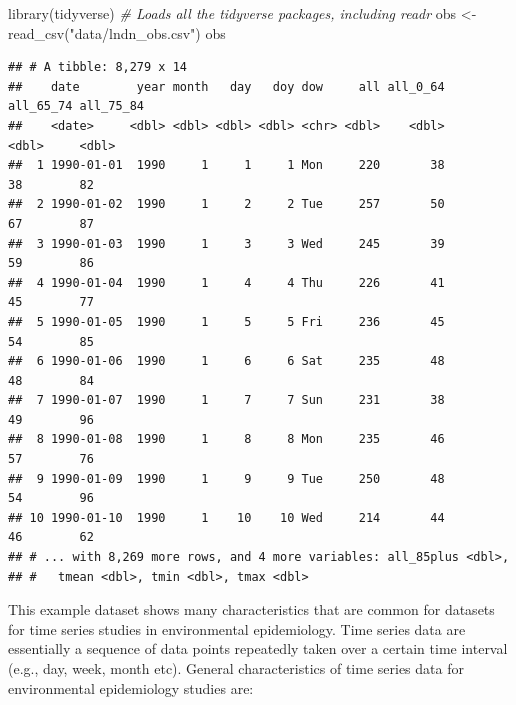 \documentclass[
]{book}
\newenvironment{Shaded}{\begin{snugshade}}{\end{snugshade}}
\newcommand{\CommentTok}[1]{\textcolor[rgb]{0.56,0.35,0.01}{\textit{#1}}}
\newcommand{\FunctionTok}[1]{\textcolor[rgb]{0.00,0.00,0.00}{#1}}
\newcommand{\NormalTok}[1]{#1}
\newcommand{\OtherTok}[1]{\textcolor[rgb]{0.56,0.35,0.01}{#1}}
\newcommand{\StringTok}[1]{\textcolor[rgb]{0.31,0.60,0.02}{#1}}
\begin{document}
\begin{Shaded}
\begin{Highlighting}[]
\FunctionTok{library}\NormalTok{(tidyverse) }\CommentTok{\# Loads all the tidyverse packages, including readr}
\NormalTok{obs }\OtherTok{\textless{}{-}} \FunctionTok{read\_csv}\NormalTok{(}\StringTok{"data/lndn\_obs.csv"}\NormalTok{)}
\NormalTok{obs}
\end{Highlighting}
\end{Shaded}

\begin{verbatim}
## # A tibble: 8,279 x 14
##    date        year month   day   doy dow     all all_0_64 all_65_74 all_75_84
##    <date>     <dbl> <dbl> <dbl> <dbl> <chr> <dbl>    <dbl>     <dbl>     <dbl>
##  1 1990-01-01  1990     1     1     1 Mon     220       38        38        82
##  2 1990-01-02  1990     1     2     2 Tue     257       50        67        87
##  3 1990-01-03  1990     1     3     3 Wed     245       39        59        86
##  4 1990-01-04  1990     1     4     4 Thu     226       41        45        77
##  5 1990-01-05  1990     1     5     5 Fri     236       45        54        85
##  6 1990-01-06  1990     1     6     6 Sat     235       48        48        84
##  7 1990-01-07  1990     1     7     7 Sun     231       38        49        96
##  8 1990-01-08  1990     1     8     8 Mon     235       46        57        76
##  9 1990-01-09  1990     1     9     9 Tue     250       48        54        96
## 10 1990-01-10  1990     1    10    10 Wed     214       44        46        62
## # ... with 8,269 more rows, and 4 more variables: all_85plus <dbl>,
## #   tmean <dbl>, tmin <dbl>, tmax <dbl>
\end{verbatim}

This example dataset shows many characteristics that are common for datasets for
time series studies in environmental epidemiology. Time series data are essentially
a sequence of data points repeatedly taken over a certain time interval (e.g., day,
week, month etc). General characteristics of time series data for environmental epidemiology studies are:
\end{document}
